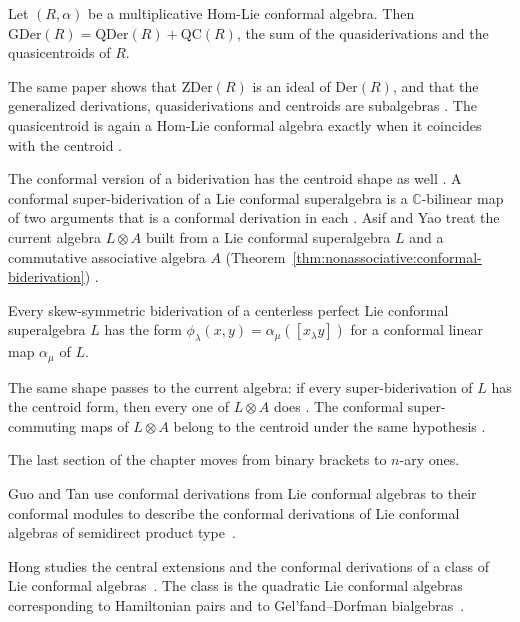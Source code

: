 \begin{theorem}\label{thm:nonassociative:hom-conformal-gder}
Let $(R,\alpha)$ be a multiplicative Hom-Lie conformal algebra. Then
$\mathrm{GDer}(R)=\mathrm{QDer}(R)+\mathrm{QC}(R)$, the sum of the
quasiderivations and the quasicentroids of $R$.
\end{theorem}

The same paper shows that $\mathrm{ZDer}(R)$ is an ideal of $\mathrm{Der}(R)$,
and that the generalized derivations, quasiderivations and centroids are
subalgebras \cite[Proposition~5.2, p.~17]{ZhaoYuanChen2018}. The quasicentroid
is again a Hom-Lie conformal algebra exactly when it coincides with the
centroid \cite[Proposition~5.6, p.~19]{ZhaoYuanChen2018}.

The conformal version of a biderivation has the centroid shape as well
\cite[Definition~2.2, p.~2]{AsifYao2023}. A conformal super-biderivation of a
Lie conformal superalgebra is a $\mathbb{C}$-bilinear map of two arguments
that is a conformal derivation in each \cite[Definition~2.2,
p.~2]{AsifYao2023}. Asif and Yao treat the current algebra $L\otimes A$ built
from a Lie conformal superalgebra $L$ and a commutative associative algebra
$A$ (Theorem~\ref{thm:nonassociative:conformal-biderivation})
\cite[p.~1]{AsifYao2023}.

\begin{theorem}\label{thm:nonassociative:conformal-biderivation}
Every skew-symmetric biderivation of a centerless perfect Lie conformal
superalgebra $L$ has the form $\phi_\lambda(x,y)=\alpha_\mu([x_\lambda y])$ for
a conformal linear map $\alpha_\mu$ of $L$.
\end{theorem}

The same shape passes to the current algebra: if every super-biderivation of
$L$ has the centroid form, then every one of $L\otimes A$ does
\cite[Theorem~3.3, p.~7]{AsifYao2023}. The conformal super-commuting maps of
$L\otimes A$ belong to the centroid under the same hypothesis
\cite[Theorem~4.4, p.~8]{AsifYao2023}.

The last section of the chapter moves from binary brackets to $n$-ary ones.

Guo and Tan use conformal derivations from Lie conformal algebras to their
conformal modules to describe the conformal derivations of Lie conformal
algebras of semidirect product
type~\cite{WlConformalDerivationsOfSemidire2014}.

Hong studies the central extensions and the conformal derivations of a class
of Lie conformal algebras~\cite{WlCentralExtensionsAndConformalD2019}. The class is the quadratic Lie conformal algebras
corresponding
to Hamiltonian pairs and to Gel'fand--Dorfman
bialgebras~\cite{WlCentralExtensionsAndConformalD2019}.
